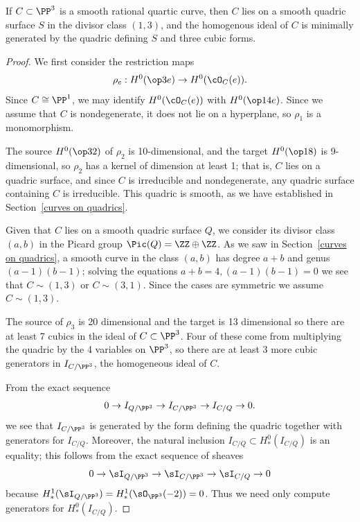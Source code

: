 \begin{proposition}\label{ideal of rational quartic}
If $C\subset \PP^3$ is a smooth rational quartic curve, then $C$ lies on a smooth quadric
surface $S$ in the divisor class $(1,3)$, and the homogenous ideal of $C$ is minimally
generated by the quadric defining $S$ and three cubic forms.
\end{proposition}

\begin{proof}
We first consider the restriction maps
$$
\rho_e: H^0(\op3e)\to H^0(\cO_C(e)).
$$
Since $C\cong \PP^1$,
we may identify $H^0(\cO_C(e))$ with $H^0(\op1{4e})$.
 Since we assume that $C$ is nondegenerate, it does not lie on a hyperplane,
 so  $\rho_1$ is a monomorphism. 
 
The source $H^0(\op32)$ of $\rho_2$ is 10-dimensional, and the target $H^0(\op18)$ is
9-dimensional, so $\rho_2$ has a kernel of dimension at least 1; that is, $C$ lies on
a quadric surface, and since $C$ is irreducible and nondegenerate, any quadric surface containing
$C$ is irreducible. This quadric is smooth, as we have established in Section~\ref{curves on quadrics}.


Given that $C$ lies on a smooth quadric surface $Q$, we consider its divisor class $(a,b)$ in the 
Picard group $\Pic(Q) = \ZZ\oplus \ZZ$. As we saw in Section~\ref{curves on quadrics}, a smooth curve
in the class $(a,b)$ has degree $a+b$ and genus $(a-1)(b-1)$; solving the equations $a+b=4, (a-1)(b-1)=0$ we see that $C\sim (1,3)$ or $C\sim (3,1)$. Since the cases
are symmetric we assume $C\sim(1,3)$. 

The source of $\rho_3$ is 20 dimensional and the target is 13 dimensional so there are at least 7
cubics in the ideal of $C\subset \PP^3$. Four of these come from multiplying the quadric
by the 4 variables on $\PP^3$, so there are at least 3 more cubic generators in $I_{C/\PP^3}$,
 the homogeneous ideal of $C$. 

From the exact sequence 
$$
0\to I_{Q/\PP^3} \to I_{C/\PP^3} \to I_{C/Q} \to 0.
$$
we see that $I_{C/\PP^3}$ is generated by the form defining the quadric 
together with generators for $I_{C/Q}$. Moreover, 
the natural inclusion $I_{C/Q}\subset H^{0}_{*}(I_{C/Q})$ is an equality; this follows from the exact sequence of sheaves
$$
0\to \sI_{Q/\PP^3} \to \sI_{C/\PP^3} \to \sI_{C/Q} \to 0
$$
because $H^{1}_{*}(\sI_{Q/\PP^3}) = H^{1}_{*}(\sO_{\PP^3}(-2)) = 0$.
Thus we need only compute generators for $H^{0}_{*}(I_{C/Q})$.


\end{proof}
